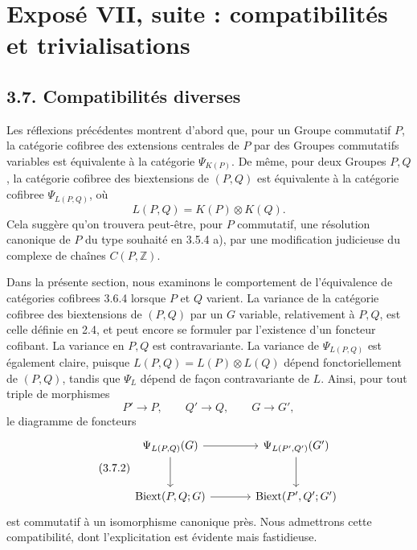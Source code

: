 \documentclass[11pt]{article}
\begin{document}
\section*{Exposé VII, suite : compatibilités et trivialisations}

\subsection*{3.7. Compatibilités diverses}

Les réflexions précédentes montrent d'abord que, pour un Groupe commutatif \(P\), la catégorie cofibree des extensions centrales de \(P\) par des Groupes commutatifs variables est équivalente à la catégorie \(\Psi_{K(P)}\).  De même, pour deux Groupes \(P,Q\), la catégorie cofibree des biextensions de \((P,Q)\) est équivalente à la catégorie cofibree \(\Psi_{L(P,Q)}\), où
\[
        L(P,Q)=K(P)\otimes K(Q).
\]
Cela suggère qu'on trouvera peut-être, pour \(P\) commutatif, une résolution canonique de \(P\) du type souhaité en 3.5.4 a), par une modification judicieuse du complexe de chaînes \(C(P,\mathbb Z)\).

Dans la présente section, nous examinons le comportement de l'équivalence de catégories cofibrees 3.6.4 lorsque \(P\) et \(Q\) varient.  La variance de la catégorie cofibree des biextensions de \((P,Q)\) par un \(G\) variable, relativement à \(P,Q\), est celle définie en 2.4, et peut encore se formuler par l'existence d'un foncteur cofibant.  La variance en \(P,Q\) est contravariante.  La variance de \(\Psi_{L(P,Q)}\) est également claire, puisque \(L(P,Q)=L(P)\otimes L(Q)\) dépend fonctoriellement de \((P,Q)\), tandis que \(\Psi_L\) dépend de façon contravariante de \(L\).  Ainsi, pour tout triple de morphismes
\begin{equation}\tag{3.7.1}
        P'\to P,
        \qquad Q'\to Q,
        \qquad G\to G',
\end{equation}
le diagramme de foncteurs
\begin{equation}\tag{3.7.2}
\begin{tikzcd}[column sep=large,row sep=large]
 \Psi_{L(P,Q)}(G) \arrow[r] \arrow[d] & \Psi_{L(P',Q')}(G') \arrow[d] \\
 \Biext(P,Q;G) \arrow[r] & \Biext(P',Q';G')
\end{tikzcd}
\end{equation}
est commutatif à un isomorphisme canonique près.  Nous admettrons cette compatibilité, dont l'explicitation est évidente mais fastidieuse.
\end{document}
